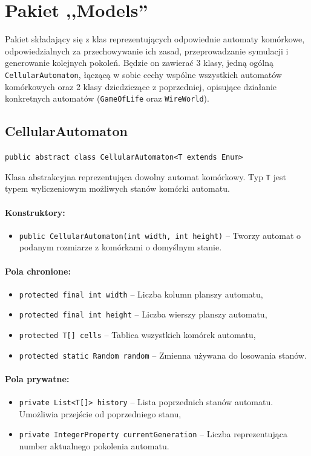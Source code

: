 \documentclass{report}
\begin{document}
\section{Pakiet ,,Models''}
Pakiet składający się z klas reprezentujących odpowiednie automaty komórkowe, odpowiedzialnych za przechowywanie ich zasad, przeprowadzanie symulacji i generowanie kolejnych pokoleń. Będzie on zawierać 3 klasy, jedną ogólną \texttt{CellularAutomaton}, łączącą w sobie cechy wspólne wszystkich automatów komórkowych oraz 2 klasy dziedziczące z poprzedniej, opisujące działanie konkretnych automatów (\texttt{GameOfLife} oraz \texttt{WireWorld}).

\subsection{CellularAutomaton} \label{subsec:cellularAutomaton}
\texttt{public abstract class CellularAutomaton<T extends Enum>}

Klasa abstrakcyjna reprezentująca dowolny automat komórkowy.
Typ \texttt{T} jest typem wyliczeniowym możliwych stanów komórki automatu.

\paragraph{Konstruktory:}
\begin{itemize}
	\item \texttt{public CellularAutomaton(int width, int height)} -- Tworzy automat o podanym rozmiarze z komórkami o domyślnym stanie.
\end{itemize}

\paragraph{Pola chronione:}
\begin{itemize}
	\item \texttt{protected final int width} -- Liczba kolumn planszy automatu,
	\item \texttt{protected final int height} -- Liczba wierszy planszy automatu,
	\item \texttt{protected T[] cells} -- Tablica wszystkich komórek automatu,
	\item \texttt{protected static Random random} -- Zmienna używana do losowania stanów.
\end{itemize}

\paragraph{Pola prywatne:}
\begin{itemize}
	\item \texttt{private List<T[]> history} -- Lista poprzednich stanów automatu. \\ Umożliwia przejście od poprzedniego stanu,
	\item \texttt{private IntegerProperty currentGeneration} -- Liczba reprezentująca number aktualnego pokolenia automatu.
\end{itemize}
\end{document}
